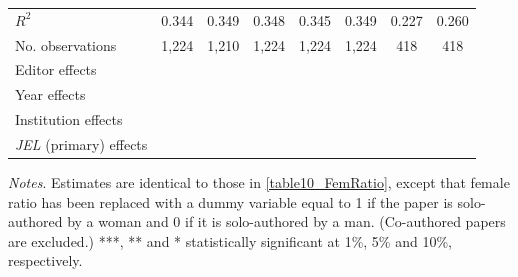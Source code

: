 \begin{table}
\begin{adjustwidth}{-0.085cm}{}
\begin{threeparttable}
\begin{tabular}{p{2.64cm}SSSSSSS}
            \midrule
            \(R^2\)                       &       0.344   &       0.349   &       0.348   &       0.345   &       0.349   &       0.227   &       0.260   \\
            No. observations              &       1,224   &       1,210   &       1,224   &       1,224   &       1,224   &         418   &         418   \\
            \midrule
            Editor effects        &           {}   &           {}   &           {}   &           {}   &           {}   &           {}   &           {}   \\
            Year effects                  &           {}   &           {}   &           {}   &           {}   &           {}   &           {}   &           {}   \\
            Institution effects           &           {}   &           {}   &           {}   &           {}   &           {}   &           {}   &           {}   \\
            \textit{JEL} (primary) effects&               &               &               &               &               &               &           {}   \\
            \bottomrule
        \end{tabular}
        \begin{tablenotes}
            \tiny
            \item \textit{Notes}. Estimates are identical to those in \autoref{table10_FemRatio}, except that female ratio has been replaced with a dummy variable equal to 1 if the paper is solo-authored by a woman and 0 if it is solo-authored by a man. (Co-authored papers are excluded.) ***, ** and * statistically significant at 1\%, 5\% and 10\%, respectively.
        \end{tablenotes}
    \end{threeparttable}
    \end{adjustwidth}
\end{table}
